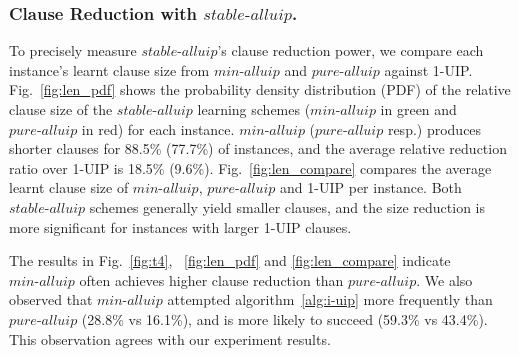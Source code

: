 \documentclass[runningheads]{llncs}
\newcommand{\oneuip}{1-UIP\xspace}
\newcommand{\stablealluip}{\textit{stable-alluip}\xspace}
\newcommand{\allUipPure}{\textit{pure-alluip}\xspace}
\newcommand{\allUipMin}{\textit{min-alluip}\xspace}
\begin{document}
\subsubsection{Clause Reduction with $\stablealluip$.}
To precisely measure $\stablealluip$'s clause reduction power, we compare
each instance's learnt clause size from $\allUipMin$ and $\allUipPure$
against \oneuip. Fig.~\ref{fig:len_pdf} shows the probability density
distribution (PDF) of the relative clause size of the $\stablealluip$
learning schemes ($\allUipMin$ in green and $\allUipPure$ in red) for
each instance. $\allUipMin$ ($\allUipPure$ resp.) produces shorter
clauses for 88.5\% (77.7\%) of instances, and the average relative
reduction ratio over \oneuip is 18.5\%
(9.6\%). Fig.~\ref{fig:len_compare} compares the average learnt
clause size of $\allUipMin$, $\allUipPure$ and \oneuip per instance.
Both $\stablealluip$ schemes generally yield smaller clauses, and the size
reduction is more significant for instances with larger \oneuip clauses.

The results in Fig.~\ref{fig:t4}, ~\ref{fig:len_pdf} and
\ref{fig:len_compare} indicate $\allUipMin$ often achieves higher
clause reduction than $\allUipPure$. We also observed that
$\allUipMin$ attempted algorithm~\ref{alg:i-uip} more frequently than
$\allUipPure$ (28.8\% vs 16.1\%), and is more likely to succeed
(59.3\% vs 43.4\%). This observation agrees with our experiment
results.
\end{document}
